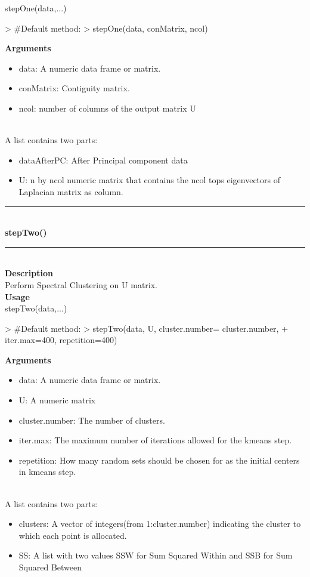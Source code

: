\documentclass{article}
\begin{document}
stepOne(data,...)
\begin{Schunk}
\begin{Sinput}
>   #Default method:
>   stepOne(data, conMatrix, ncol)
\end{Sinput}
\end{Schunk}
{\bf Arguments}
\begin {itemize}
\item data: A numeric data frame or matrix.
\item conMatrix: Contiguity matrix.
\item ncol: number of columns of the output matrix U
 
\end {itemize}
\hspace*{5mm}{\bf Returns}\\

  A list contains two parts:
\begin{itemize}
  \item  dataAfterPC: After Principal component data
  \item  U: n by ncol numeric matrix that contains the ncol tops eigenvectors of Laplacian matrix as column.
\end{itemize}

\noindent\rule{14cm}{0.4pt}\\
{\bf \large stepTwo() } \\
\noindent\rule{14cm}{0.4pt}\\
{\bf Description}\\
Perform Spectral Clustering on U matrix.\\

{\bf Usage}\\

stepTwo(data,...)
\begin{Schunk}
\begin{Sinput}
>   #Default method:
>   stepTwo(data, U, cluster.number= cluster.number,
+           iter.max=400, repetition=400)
\end{Sinput}
\end{Schunk}
{\bf Arguments}
\begin {itemize}
\item data: A numeric data frame or matrix.
\item U: A numeric matrix 
\item cluster.number: The number of clusters.
\item iter.max: The maximum number of iterations allowed for the kmeans step. 
\item repetition: How  many  random  sets  should  be  chosen for  as  the  initial centers in kmeans step.
\end {itemize}
\hspace*{5mm}{\bf Returns}\\
 A list contains two parts:
 \begin{itemize}
 \item clusters: A vector of integers(from 1:cluster.number) indicating the cluster to which each point is allocated.
 \item SS: A list with two values SSW for Sum Squared Within and SSB for Sum Squared Between
 \end{itemize}
\end{document}
